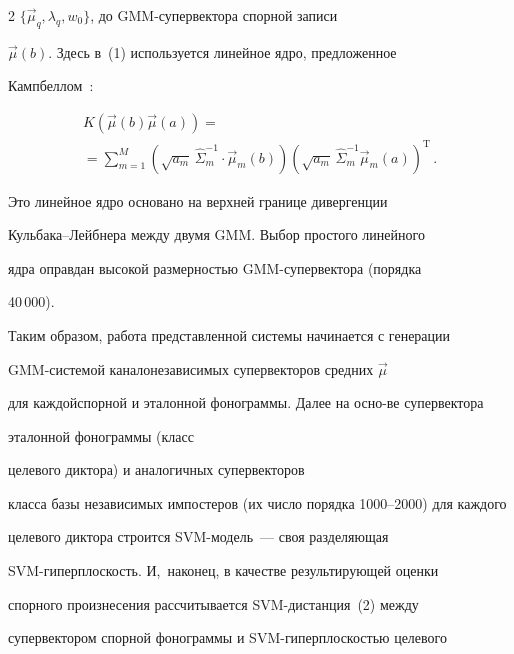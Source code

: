 \begin{multicols}{2}
$\{\vec{\mu}_q,\lambda_q,w_0\}$, до GMM-су\-пер\-век\-то\-ра спорной записи 


$\vec{\mu}(b)$. Здесь в~(1) используется линейное ядро, предложенное 


Кампбеллом~\cite{10b}:


  \begin{multline*}


  K(\vec{\mu}(b)\vec{\mu}(a))={}\\


  {}=\sum\limits_{m=1}^M \left( \sqrt{a_m}\,


  \hat{\Sigma}_m^{-1} \cdot \vec{\mu}_m(b)\right) \left( 


\sqrt{a_m}\,\hat{\Sigma}_m^{-1}\vec{\mu}_m(a)\right)^{\mathrm{T}}\,.




  \end{multline*}




  Это линейное ядро основано на верхней границе дивергенции 


  Куль\-ба\-ка--Лейб\-не\-ра между двумя GMM. Выбор простого линейного 


ядра оправдан высокой размерностью GMM-су\-пер\-век\-то\-ра (порядка 


40\,000).


  


  Таким образом, работа представленной системы начинается с генерации 


GMM-сис\-те\-мой каналонезависимых супервекторов средних $\vec{\mu}$ 


для каждой\linebreak спорной и эталонной фонограммы. Далее на осно-\linebreak ве супервектора 


эталонной фонограммы (класс\linebreak


 целевого диктора) и аналогичных супервекторов 


класса базы независимых импостеров (их число порядка 1000--2000) для каждого 


целевого диктора строится SVM-мо\-дель~--- своя разделяющая 


SVM-ги\-пер\-плос\-кость. И,~наконец, в качестве ре\-зуль\-ти\-ру\-ющей оценки 


спорного произнесения рассчитывается SVM-дис\-тан\-ция~(2) между 


супервектором спорной фонограммы и SVM-ги\-пер\-плос\-костью целевого 



\end{multicols}
